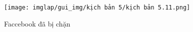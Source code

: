 \documentclass[13pt]{article}
\begin{document}
\begin{figure}[H]
                                                                                                                                    \centering
                                                                                                                                    \texttt{[image: imglap/gui\_img/kịch bản 5/kịch bản 5.11.png]}
                                                                                                                                    \caption{Faccebook đã bị chặn}
                                                                                                                                    \label{fig:enter-label}
                                                                                                                                \end{figure}                                                                                    
\end{document}
